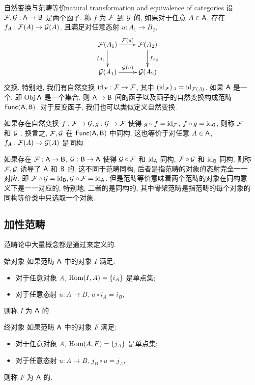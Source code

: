 \begin{definition}{自然变换与范畴等价}{natural transformation and equivalence of categories}
设 $\CF,\CG:\cA\to \cB$ 是两个函子. 称 $f$ 为 $\CF$ 到 $\CG$ 的, 如果对于任意 $A\in\cA$, 存在 $f_A:\CF(A)\to\CG(A)$, 且满足对任意态射 $u:A_1\to B_2$,
  \[\xymatrix{
\CF(A_1)\ar[r]^{\CF(u)}\ar[d]_{f_{A_1}}&\CF(A_2)\ar[d]^{f_{A_2}}\\
\CG(A_1)\ar[r]^{\CG(u)}&\CG(A_2)
}\]
交换. 特别地, 我们有自然变换 $\id_\CF:\CF\to \CF$, 其中 $(\id_\CF)_A=\id_{\CF(A)}$. 如果 $\cA$ 是一个, 即 $\Obj \cA$ 是一个集合, 则 $\cA\to\cB$ 间的函子以及函子的自然变换构成范畴 $\cFunc(\cA,\cB)$. 对于反变函子, 我们也可以类似定义自然变换. 

如果存在自然变换 $f:\CF\to\CG,g:\CG\to \CF$ 使得 $g\circ f=\id_\CF$, $f\circ g=\id_\CG$, 则称 $\CF$ 和 $\CG$ . 换言之, $\CF,\CG$ 在 $\cFunc(\cA,\cB)$ 中同构. 这也等价于对任意 $A\in\cA$, $f_A:\CF(A)\ra\CG(A)$ 是同构.

如果存在 $\CF:\cA\to \cB$, $\CG:\cB\to \cA$ 使得 $\CG\circ \CF$ 和 $\id_\cA$ 同构, $\CF\circ \CG$ 和 $\id_\cB$ 同构, 则称 $\CF,\CG$ 诱导了 $\cA$ 和 $\cB$ 的. 这不同于范畴同构, 后者是指范畴的对象的态射完全一一对应, 即 $\CF\circ\CG=\id_\cB,\CG\circ\CF=\id_\cA$. 但是范畴等价意味着两个范畴的对象在同构意义下是一一对应的, 特别地, 二者的是同构的, 其中骨架范畴是指范畴的每个对象的同构等价类中只选取一个对象.
\end{definition}





\subsection{加性范畴}\label{subsec:additive_category}

范畴论中大量概念都是通过来定义的.

\begin{definition}{始对象}{}
如果范畴 $\cA$ 中的对象 $I$ 满足:
\begin{itemize}
\item 对于任意对象 $A$, $\Hom(I,A)=\set{i_A}$ 是单点集;
\item 对于任意态射 $u:A\to B$, $u\circ i_A=i_B$,
\end{itemize}
则称 $I$ 为 $\cA$ 的.
\end{definition}

\begin{definition}{终对象}{}
如果范畴 $\cA$ 中的对象 $F$ 满足:
\begin{itemize}
\item 对于任意对象 $A$, $\Hom(A,F)=\set{j_A}$ 是单点集;
\item 对于任意态射 $u:A\to B$, $j_B\circ u=j_A$,
\end{itemize}
则称 $F$ 为 $\cA$ 的.
\end{definition}

